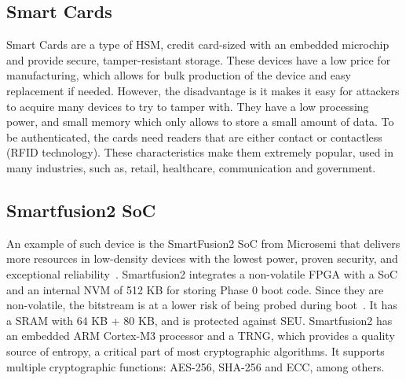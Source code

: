 \subsection*{Smart Cards}\label{chap:background:computing:smartcards}
Smart Cards are a type of \ac{HSM}, credit card-sized with an embedded microchip and provide secure, tamper-resistant storage. These devices have a low price for manufacturing, which allows for bulk production of the device and easy replacement if needed. However, the disadvantage is it makes it easy for attackers to acquire many devices to try to tamper with. They have a low processing power, and small memory which only allows to store a small amount of data. To be authenticated, the cards need readers that are either contact or contactless (RFID technology). These characteristics make them extremely popular, used in many industries, such as, retail, healthcare, communication and government.


\subsection{Smartfusion2 SoC}\label{chap:background:computing:smartfusion}
An example of such device is the SmartFusion2 \ac{SoC} from Microsemi that delivers more resources in low-density devices with the lowest power, proven security, and exceptional reliability~\cite{smartfusion2soc}. Smartfusion2 integrates a non-volatile \ac{FPGA} with a \ac{SoC} and an internal \ac{NVM} of 512 KB for storing Phase 0 boot code.
Since they are non-volatile, the bitstream is at a lower risk of being probed during boot~\cite{parrinha2017flexible}. It has a \ac{SRAM} with 64 KB + 80 KB, and is protected against \ac{SEU}. Smartfusion2 has an embedded ARM Cortex-M3 processor and a \ac{TRNG}, which provides a quality source of entropy, a critical part of most cryptographic algorithms. It supports multiple cryptographic functions: \ac{AES}-256, \ac{SHA}-256 and \ac{ECC}, among others.

